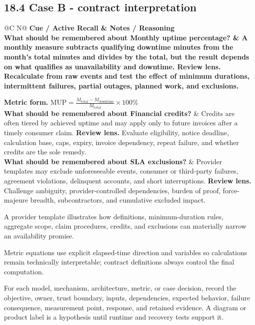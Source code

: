 \documentclass[11pt]{article}
\newcommand{\CornellHeader}{\rowcolor{Navy}\color{white}\bfseries Cue / Active Recall & \color{white}\bfseries Notes / Reasoning \\\endhead}
\newcommand{\CornellRow}[2]{\cellcolor{CueGray}\textbf{#1} & #2 \\\addlinespace[3pt]}
\begin{document}
\subsection{18.4 Case B - contract interpretation}
\begin{longtable}{@{}C N@{}}
\CornellHeader
\CornellRow{What should be remembered about Monthly uptime percentage?}{A monthly measure subtracts qualifying downtime minutes from the month's total minutes and divides by the total, but the result depends on what qualifies as unavailability and downtime. \textbf{Review lens.} Recalculate from raw events and test the effect of minimum durations, intermittent failures, partial outages, planned work, and exclusions.\par\smallskip\textbf{Metric form.} \(\displaystyle \mathrm{MUP}=\frac{M_{\mathrm{total}}-M_{\mathrm{downtime}}}{M_{\mathrm{total}}}\times100\%\)}
\CornellRow{What should be remembered about Financial credits?}{Credits are often tiered by achieved uptime and may apply only to future invoices after a timely consumer claim. \textbf{Review lens.} Evaluate eligibility, notice deadline, calculation base, caps, expiry, invoice dependency, repeat failure, and whether credits are the sole remedy.}
\CornellRow{What should be remembered about SLA exclusions?}{Provider templates may exclude unforeseeable events, consumer or third-party failures, agreement violations, delinquent accounts, and short interruptions. \textbf{Review lens.} Challenge ambiguity, provider-controlled dependencies, burden of proof, force-majeure breadth, subcontractors, and cumulative excluded impact.}
\end{longtable}
\begin{sectionsummarybox}
A provider template illustrates how definitions, minimum-duration rules, aggregate scope, claim procedures, credits, and exclusions can materially narrow an availability promise.
\end{sectionsummarybox}
\begin{scopenotebox}
Metric equations use explicit elapsed-time direction and variables so calculations remain technically interpretable; contract definitions always control the final computation.
\end{scopenotebox}
\begin{practicebox}
For each model, mechanism, architecture, metric, or case decision, record the objective, owner, trust boundary, inputs, dependencies, expected behavior, failure consequence, measurement point, response, and retained evidence. A diagram or product label is a hypothesis until runtime and recovery tests support it.
\end{practicebox}
\end{document}
